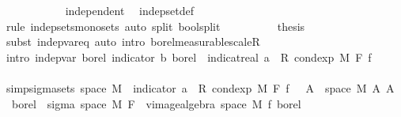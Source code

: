 \begin{isabellebody}
\ \ \ \ \ \ \ \ \ \ \isamarkupfalse%
\ independent\ \isamarkupfalse%
\ indep{\isacharunderscore}{\kern0pt}set{\isacharunderscore}{\kern0pt}def\ \isamarkupfalse%
\ {\isacharparenleft}{\kern0pt}rule\ indep{\isacharunderscore}{\kern0pt}sets{\isacharunderscore}{\kern0pt}mono{\isacharunderscore}{\kern0pt}sets{\isacharcomma}{\kern0pt}\ auto\ split{\isacharcolon}{\kern0pt}\ bool{\isachardot}{\kern0pt}split{\isacharparenright}{\kern0pt}\isanewline
\ \ \ \ \ \ \ \ \isamarkupfalse%
\ {\isacharquery}{\kern0pt}thesis\ \isamarkupfalse%
\ {\isacharparenleft}{\kern0pt}subst\ indep{\isacharunderscore}{\kern0pt}var{\isacharunderscore}{\kern0pt}eq{\isacharcomma}{\kern0pt}\ auto\ intro{\isacharbang}{\kern0pt}{\isacharcolon}{\kern0pt}\ borel{\isacharunderscore}{\kern0pt}measurable{\isacharunderscore}{\kern0pt}scaleR{\isacharparenright}{\kern0pt}\isanewline
\ \ \ \ \ \ \isamarkupfalse%
\isanewline
\isanewline
\ \ \ \ \ \ \isamarkupfalse%
\ {\isacharbrackleft}{\kern0pt}intro{\isacharbrackright}{\kern0pt}{\isacharcolon}{\kern0pt}\ {\isachardoublequoteopen}indep{\isacharunderscore}{\kern0pt}var\ borel\ {\isacharparenleft}{\kern0pt}indicator\ b{\isacharparenright}{\kern0pt}\ borel\ {\isacharparenleft}{\kern0pt}{\isasymlambda}{\isasymomega}{\isachardot}{\kern0pt}\ indicat{\isacharunderscore}{\kern0pt}real\ a\ {\isasymomega}\ {\isacharasterisk}{\kern0pt}\isactrlsub R\ cond{\isacharunderscore}{\kern0pt}exp\ M\ F\ f\ {\isasymomega}{\isacharparenright}{\kern0pt}{\isachardoublequoteclose}\isanewline
\ \ \ \ \ \ \isamarkupfalse%
\ {\isacharminus}{\kern0pt}\isanewline
\ \ \ \ \ \ \ \ \isamarkupfalse%
\ {\isacharbrackleft}{\kern0pt}simp{\isacharbrackright}{\kern0pt}{\isacharcolon}{\kern0pt}{\isachardoublequoteopen}sigma{\isacharunderscore}{\kern0pt}sets\ {\isacharparenleft}{\kern0pt}space\ M{\isacharparenright}{\kern0pt}\ {\isacharbraceleft}{\kern0pt}{\isacharparenleft}{\kern0pt}{\isasymlambda}{\isasymomega}{\isachardot}{\kern0pt}\ indicator\ a\ {\isasymomega}\ {\isacharasterisk}{\kern0pt}\isactrlsub R\ cond{\isacharunderscore}{\kern0pt}exp\ M\ F\ f\ {\isasymomega}{\isacharparenright}{\kern0pt}\ {\isacharminus}{\kern0pt}{\isacharbackquote}{\kern0pt}\ A\ {\isasyminter}\ space\ M\ {\isacharbar}{\kern0pt}A{\isachardot}{\kern0pt}\ A\ {\isasymin}\ borel{\isacharbraceright}{\kern0pt}\ {\isasymsubseteq}\ sigma\ {\isacharparenleft}{\kern0pt}space\ M{\isacharparenright}{\kern0pt}\ {\isacharparenleft}{\kern0pt}F\ {\isasymunion}\ vimage{\isacharunderscore}{\kern0pt}algebra\ {\isacharparenleft}{\kern0pt}space\ M{\isacharparenright}{\kern0pt}\ f\ borel{\isacharparenright}{\kern0pt}{\isachardoublequoteclose}\isanewline

\end{isabellebody}
